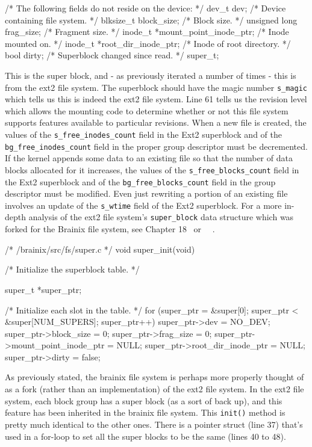 \begin{code}[numbers=left,firstnumber=35]
{      /* The following fields do not reside on the device: */
      dev_t dev;                         /* Device containing file system. */
      blksize_t block_size;              /* Block size.                    */
      unsigned long frag_size;           /* Fragment size.                 */
      inode_t *mount_point_inode_ptr;    /* Inode mounted on.              */
      inode_t *root_dir_inode_ptr;       /* Inode of root directory.       */
      bool dirty;                        /* Superblock changed since read. */
 } super_t;
\end{code}
This is the super block, and - as previously iterated a number of times - this is from the ext2 file system. The superblock should have the magic number \verb|s_magic| which tells us this is indeed the ext2 file system. Line 61 tells us the revision level which allows the mounting code to determine whether or not this file system supports features available to particular revisions. When a new file is created, the values of the \verb|s_free_inodes_count| field in the Ext2 superblock and of the \verb|bg_free_inodes_count| field in the proper group descriptor must be decremented. If the kernel appends some data to an existing file so that the number of data blocks allocated for it increases, the values of the \verb|s_free_blocks_count| field in the Ext2 superblock and of the \verb|bg_free_blocks_count| field in the group descriptor must be modified. Even just rewriting a portion of an existing file involves an update of the \verb|s_wtime| field of the Ext2 superblock. For a more in-depth analysis of the ext2 file system's \verb|super_block| data structure which was forked for the Brainix file system, see Chapter 18~\cite{linuxbook} or \cite{3}~\cite{7}~\cite{8}.
\begin{code}[numbers=left,firstnumber=32]
/* /brainix/src/fs/super.c */
 void super_init(void)
{

 /* Initialize the superblock table. */

      super_t *super_ptr;

      /* Initialize each slot in the table. */
      for (super_ptr = &super[0]; super_ptr < &super[NUM_SUPERS]; super_ptr++)
      {
           super_ptr->dev = NO_DEV;
           super_ptr->block_size = 0;
           super_ptr->frag_size = 0;
           super_ptr->mount_point_inode_ptr = NULL;
           super_ptr->root_dir_inode_ptr = NULL;
           super_ptr->dirty = false;
      }
 }
\end{code}
As previously stated, the brainix file system is perhaps more properly thought of as a fork (rather than an implementation) of the ext2 file system. In the ext2 file system, each block group has a super block (as a sort of back up), and this feature has been inherited in the brainix file system. This \verb|init()| method is pretty much identical to the other ones. There is a pointer struct (line 37) that's used in a for-loop to set all the super blocks to be the same (lines 40 to 48).

